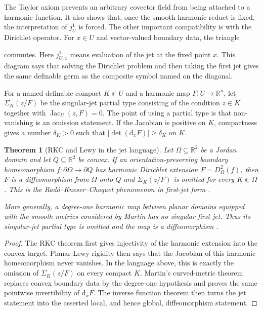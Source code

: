 \documentclass{amsart}
\newtheorem{theorem}{Theorem}[section]
\theoremstyle{definition}
\theoremstyle{remark}
\numberwithin{equation}{section}
\begin{document}
The Taylor axiom prevents an arbitrary covector field from being attached to
a harmonic function. It also shows that, once the smooth harmonic reduct is
fixed, the interpretation of $j^1_U$ is forced. The other important
compatibility is with the Dirichlet operator. For $x\in U$ and vector-valued
boundary data, the triangle
\begin{center}
\end{center}
commutes. Here $j^1_{U,x}$ means evaluation of the jet at the fixed point $x$.
This diagram says that solving the Dirichlet problem and then taking the first
jet gives the same definable germ as the composite symbol named on the
diagonal.

For a named definable compact $K\Subset U$ and a harmonic map
$F:U\to\mathbb R^n$, let
$\Sigma_K(z/F)$ be the singular-jet partial type consisting of the condition
$z\in K$ together with $\operatorname{Jac}_U(z,F)=0$. The point of using a
partial type is that non-vanishing is an omission statement. If the Jacobian
is positive on $K$, compactness gives a number $\delta_K>0$ such that
$|\det(\mathrm{d}_xF)|\ge\delta_K$ on $K$. %

\begin{theorem}[RKC and Lewy in the jet language]
\label{thm:RKC-Lewy-jet}
Let $\Omega\subseteq\mathbb R^2$ be a Jordan domain and let $Q\subseteq
\mathbb R^2$ be convex. If an orientation-preserving boundary homeomorphism
$f:\partial\Omega\to\partial Q$ has harmonic Dirichlet extension
$F=D_\Omega^2(f)$, then $F$ is a diffeomorphism from $\Omega$ onto $Q$ and
$\Sigma_K(z/F)$ is omitted for every $K\Subset\Omega$. This is the
Rad\'o--Kneser--Choquet phenomenon in first-jet form
\cite{IwaniecOnninen2014RKC,IwaniecOnninen2019RKC}.

More generally, a degree-one harmonic map between planar domains equipped
with the smooth metrics considered by Martin has no singular first jet. Thus
its singular-jet partial type is omitted and the map is a diffeomorphism
\cite{Martin2016CurvedLewy}.
\end{theorem}

\begin{proof}
The RKC theorem first gives injectivity of the harmonic extension into the
convex target. Planar Lewy rigidity then says that the Jacobian of this
harmonic homeomorphism never vanishes. In the language above, this is exactly
the omission of $\Sigma_K(z/F)$ on every compact $K$. Martin's curved-metric
theorem replaces convex boundary data by the degree-one hypothesis and proves
the same pointwise invertibility of $\mathrm{d}_xF$. The inverse function theorem then
turns the jet statement into the asserted local, and hence global,
diffeomorphism statement.
\end{proof}
\end{document}
